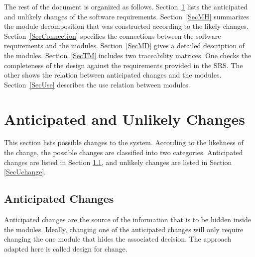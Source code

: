 \documentclass[12pt, titlepage]{article}
\begin{document}
The rest of the document is organized as follows. Section~\ref{SecChange} lists the anticipated and unlikely changes of the software
requirements. Section~\ref{SecMH} summarizes the module decomposition that
was constructed according to the likely changes. Section~\ref{SecConnection}
specifies the connections between the software requirements and the
modules. Section~\ref{SecMD} gives a detailed description of the
modules. Section~\ref{SecTM} includes two traceability matrices. One checks
the completeness of the design against the requirements provided in the SRS. The
other shows the relation between anticipated changes and the modules. Section~\ref{SecUse} describes the use relation between modules.


\section{Anticipated and Unlikely Changes} \label{SecChange}

This section lists possible changes to the system. According to the likeliness
of the change, the possible changes are classified into two
categories. Anticipated changes are listed in Section \ref{SecAchange}, and
unlikely changes are listed in Section \ref{SecUchange}.

\subsection{Anticipated Changes} \label{SecAchange}

Anticipated changes are the source of the information that is to be hidden
inside the modules. Ideally, changing one of the anticipated changes will only
require changing the one module that hides the associated decision. The approach
adapted here is called design for
change.
\end{document}
